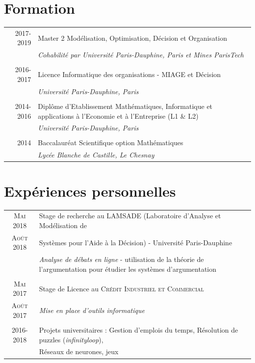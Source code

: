 \documentclass[a4paper,10pt]{article}
\begin{document}

\section{Formation}
\begin{tabular}{r|p{11cm}}
 \textsc{2017-2019} & Master 2 Modélisation, Optimisation, Décision et Organisation \\&\emph{\small{Cohabilité par Université Paris-Dauphine, Paris et Mines ParisTech}}\\\multicolumn{2}{c}{} \\
 \textsc{2016-2017} & Licence Informatique des organisations - MIAGE et Décision \\&\emph{\small{Université Paris-Dauphine, Paris}}\\\multicolumn{2}{c}{} \\
 \textsc{2014-2016} & Diplôme d'Etablissement Mathématiques, Informatique et applications à l'Economie et à l'Entreprise (L1 \& L2) \\&\emph{\small{Université Paris-Dauphine, Paris}}\\\multicolumn{2}{c}{} \\
 \textsc{2014} & Baccalauréat Scientifique option Mathématiques \\&\emph{\small{Lycée Blanche de Castille, Le Chesnay}}\\
\end{tabular}

\section{Expériences personnelles}
\begin{tabular}{cl}	
 \textsc{Mai} 2018 & Stage de recherche au \textsc{LAMSADE} (Laboratoire d'Analyse et Modélisation de\\ \textsc{Août} 2018 & Systèmes pour l'Aide à la Décision) - Université Paris-Dauphine\\
  & \emph{Analyse de débats en ligne} - utilisation de la théorie de l'argumentation pour étudier les systèmes d'argumentation\\&\\
 \textsc{Mai} 2017 & Stage de Licence au \textsc{Crédit Industriel et Commercial}\\
 \textsc{Août} 2017 & \emph{Mise en place d'outils informatique}\\&\\
 2016-2018 & Projets universitaires : Gestion d'emplois du temps, Résolution de puzzles (\emph{\small{infinityloop}}),\\& Réseaux de neurones, jeux
\end{tabular}
\end{document}

